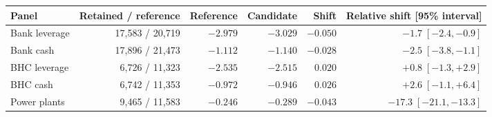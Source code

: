 \begin{tabular}{lrrrrr}
\toprule
Panel & Retained / reference & Reference & Candidate & Shift & Relative shift [95\% interval] \\
\midrule
Bank leverage & 17,583 / 20,719 & $-2.979$ & $-3.029$ & $-0.050$ & $-1.7\;[-2.4, -0.9]$ \\
Bank cash & 17,896 / 21,473 & $-1.112$ & $-1.140$ & $-0.028$ & $-2.5\;[-3.8, -1.1]$ \\
BHC leverage & 6,726 / 11,323 & $-2.535$ & $-2.515$ & $0.020$ & $+0.8\;[-1.3, +2.9]$ \\
BHC cash & 6,742 / 11,353 & $-0.972$ & $-0.946$ & $0.026$ & $+2.6\;[-1.1, +6.4]$ \\
Power plants & 9,465 / 11,583 & $-0.246$ & $-0.289$ & $-0.043$ & $-17.3\;[-21.1, -13.3]$ \\
\bottomrule
\end{tabular}
